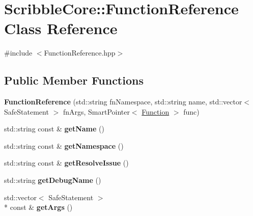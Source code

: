 \hypertarget{class_scribble_core_1_1_function_reference}{\section{Scribble\-Core\-:\-:Function\-Reference Class Reference}
\label{class_scribble_core_1_1_function_reference}
}


{\ttfamily \#include $<$Function\-Reference.\-hpp$>$}

\subsection*{Public Member Functions}
\begin{DoxyCompactItemize}
\item 
\hypertarget{class_scribble_core_1_1_function_reference_a79bf4edbc9e885b8950d599fa87be039}{{\bfseries Function\-Reference} (std\-::string fn\-Namespace, std\-::string name, std\-::vector$<$ Safe\-Statement $>$ fn\-Args, Smart\-Pointer$<$ \hyperlink{class_a_p_i_1_1_function}{Function} $>$ func)}\label{class_scribble_core_1_1_function_reference_a79bf4edbc9e885b8950d599fa87be039}

\item 
\hypertarget{class_scribble_core_1_1_function_reference_a3503eee3d549b5c6f414950f62bbca33}{std\-::string const \& {\bfseries get\-Name} ()}\label{class_scribble_core_1_1_function_reference_a3503eee3d549b5c6f414950f62bbca33}

\item 
\hypertarget{class_scribble_core_1_1_function_reference_a5a9260934ab22f221958f6f4e9741b1a}{std\-::string const \& {\bfseries get\-Namespace} ()}\label{class_scribble_core_1_1_function_reference_a5a9260934ab22f221958f6f4e9741b1a}

\item 
\hypertarget{class_scribble_core_1_1_function_reference_a29fad58add2d8262c02b842269046d37}{std\-::string const \& {\bfseries get\-Resolve\-Issue} ()}\label{class_scribble_core_1_1_function_reference_a29fad58add2d8262c02b842269046d37}

\item 
\hypertarget{class_scribble_core_1_1_function_reference_a84339654ac185758f59f759d0de3d74d}{std\-::string {\bfseries get\-Debug\-Name} ()}\label{class_scribble_core_1_1_function_reference_a84339654ac185758f59f759d0de3d74d}

\item 
\hypertarget{class_scribble_core_1_1_function_reference_a2972619b5377b0c600556523b9083c90}{std\-::vector$<$ Safe\-Statement $>$\\*
 const \& {\bfseries get\-Args} ()}\label{class_scribble_core_1_1_function_reference_a2972619b5377b0c600556523b9083c90}


\end{DoxyCompactItemize}
